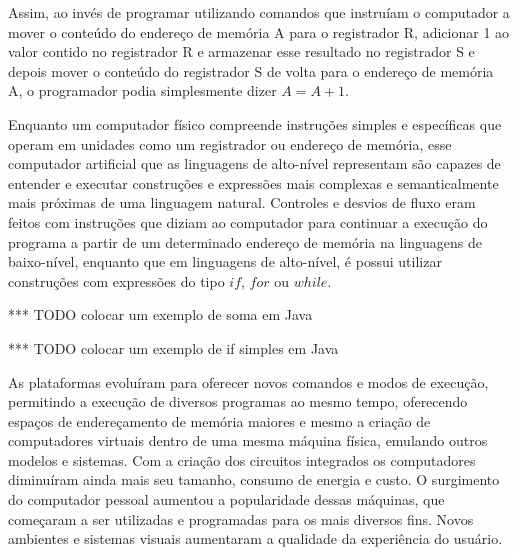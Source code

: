 \documentclass[11pt,twoside,a4paper]{book}
\begin{document}
Assim, ao invés de programar utilizando comandos que instruíam o computador a mover o conteúdo do endereço de memória A para o registrador R, adicionar 1 ao valor contido no registrador R e armazenar esse resultado no registrador S e depois mover o conteúdo do registrador S de volta para o endereço de memória A, o programador podia simplesmente dizer $A = A + 1$.

Enquanto um computador físico compreende instruções simples e específicas que operam em unidades como um registrador ou endereço de memória, esse computador artificial que as linguagens de alto-nível representam são capazes de entender e executar construções e expressões mais complexas e semanticalmente mais próximas de uma linguagem natural. Controles e desvios de fluxo eram feitos com instruções que diziam ao computador para continuar a execução do programa a partir de um determinado endereço de memória na linguagens de baixo-nível, enquanto que em linguagens de alto-nível, é possui utilizar construções com expressões do tipo $if$, $for$ ou $while$.

*** TODO colocar um exemplo de soma em Java

*** TODO colocar um exemplo de if simples em Java



As plataformas evoluíram para oferecer novos comandos e modos de execução, permitindo a execução de diversos programas ao mesmo tempo, oferecendo espaços de endereçamento de memória maiores e mesmo a criação de computadores virtuais dentro de uma mesma máquina física, emulando outros modelos e sistemas. Com a criação dos circuitos integrados os computadores diminuíram ainda mais seu tamanho, consumo de energia e custo. O surgimento do computador pessoal aumentou a popularidade dessas máquinas, que começaram a ser utilizadas e programadas para os mais diversos fins. Novos ambientes e sistemas visuais aumentaram a qualidade da experiência do usuário.
\end{document}
